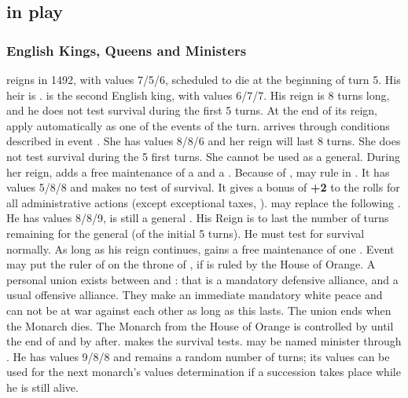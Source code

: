 
\subsection{ in play}
\subsubsection{English Kings, Queens and Ministers}
 reigns in 1492, with values 7/5/6,
scheduled to die at the beginning of turn 5. His heir is .
 is the second English king, with
values 6/7/7. His reign is 8 turns long, and he does not test survival
during the first 5 turns. At the end of its reign, apply automatically
 as one of the events of the turn.
 arrives through conditions
described in event . She has values 8/8/6
and her reign will last 8 turns. She does not test survival during the 5
first turns. She cannot be used as a general. During her reign, \ENG
adds a free maintenance of a \FLEET\faceplus and a \corsaire\faceplus.
 Because of
,  may rule in
\ENG. It has values 5/8/8 and makes no test of survival. It gives a
bonus of {\bf +2} to the rolls for all administrative actions (except
exceptional taxes, ).
 may replace the 
following . He has values 8/8/9, is
still a general .  His Reign is to last the number
of turns remaining for the general (of the initial 5 turns).  He must
test for survival normally. As long as his reign continues, \ENG gains a
free maintenance of one \ARMY\faceplus.
 Event
 may put the ruler of \HOL on the
throne of \ENG, if \HOL is ruled by the House of Orange.
\bparag A personal union exists between \HOL and \ENG: that is a
mandatory defensive alliance, and a usual offensive alliance. They make
an immediate mandatory white peace and can not be at war against each
other as long as this lasts. The union ends when the Monarch dies.
\bparag The Monarch from the House of Orange is controlled by \ANG until
the end of  and by \HOL after. \HOL
makes the survival tests.
 may be named minister through
. He has values 9/8/8 and remains a random
number of turns; its values can be used for the next monarch's values
determination if a succession takes place while he is still alive.

